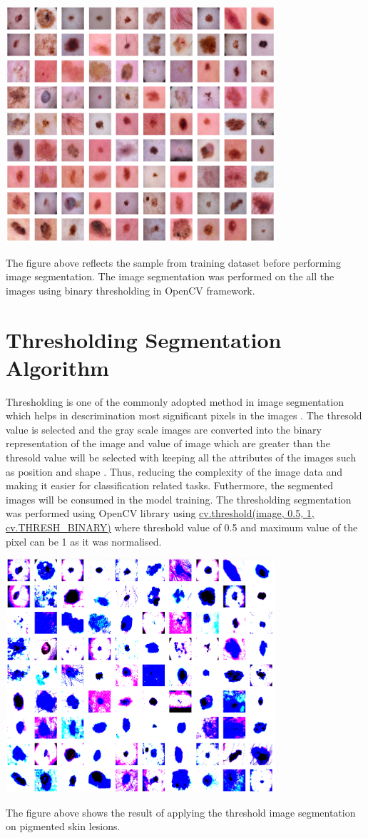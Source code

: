 \begin{center}
	\includegraphics[width=10cm]{Images/bseg.png}
\end{center}

The figure above reflects the sample from training dataset before performing image segmentation.
The image segmentation was performed on the all the images using binary thresholding in OpenCV framework.

\section{Thresholding Segmentation Algorithm}

Thresholding is one of the commonly adopted method in image segmentation which helps in descrimination most 
significant pixels in the images \citep*{al2010image}. The thresold value is selected and the gray scale images  
are converted into the binary representation of the image and value of image which are greater than the thresold
value will be selected with keeping all the attributes of the images such as position and shape \citep*{al2010image}. 
Thus, reducing the complexity of the image data and making it easier for classification related tasks. Futhermore, the 
segmented images will be consumed in the model training. The thresholding segmentation was performed using OpenCV library using 
\url{cv.threshold(image, 0.5, 1, cv.THRESH_BINARY)} where threshold value of 0.5 and maximum value of the pixel can be 1
as it was normalised.

\begin{center}
	\includegraphics[width=10cm]{Images/aseg.png}
\end{center}

The figure above shows the result of applying the threshold image segmentation on pigmented skin lesions. 
